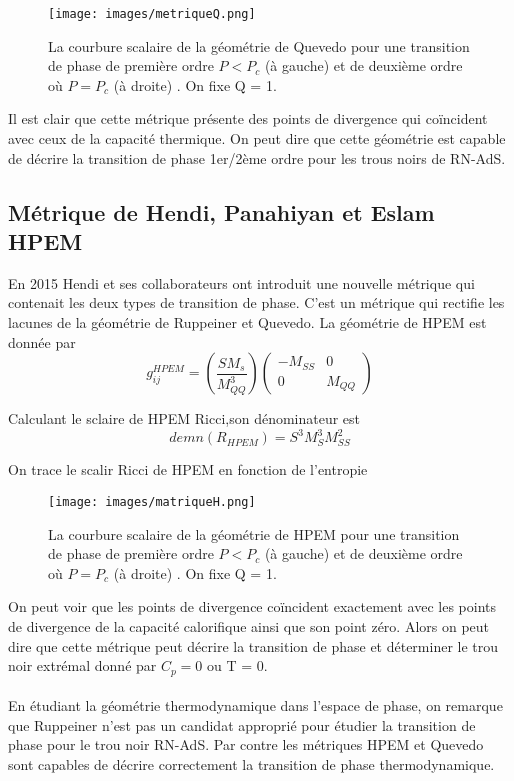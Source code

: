 \documentclass[12pt,  a4paper, openright]{report} %
\begin{document}
\begin{figure}[H]
	\texttt{[image: images/metriqueQ.png]}
	\caption{La courbure scalaire de la géométrie de Quevedo pour une transition de phase
		de première ordre $P < P_{c}$ (à gauche) et de deuxième ordre où $P = P_{c}$ (à droite) . On fixe Q = 1.}
\end{figure}

Il est clair que cette métrique présente des points de divergence qui coïncident avec
ceux de la capacité thermique. On peut dire que cette géométrie est capable de décrire la
transition de phase 1er/2ème ordre pour les trous noirs de RN-AdS.

\subsection{Métrique de Hendi, Panahiyan et Eslam HPEM}
En 2015 Hendi et ses collaborateurs ont introduit une nouvelle métrique \cite{56} qui contenait les deux types de transition de phase. C’est un métrique qui rectifie les lacunes de la
géométrie de Ruppeiner et Quevedo. La géométrie de HPEM est donnée par
\begin{equation}
g_{ij}^{HPEM}=\left( \dfrac{S M_{s}}{M_{QQ}^{3}}\right)
\begin{pmatrix}
-M_{SS}  & 0\\
0        & M_{QQ}
\end{pmatrix}
\end{equation}

Calculant le sclaire de HPEM Ricci,son dénominateur est 
\begin{equation}
demn(R_{HPEM})=S^{3}M_{S}^{3}M_{SS}^{2}
\end{equation}

On trace le scalir Ricci de HPEM  en fonction de l'entropie\\

\begin{figure}[H]
	\texttt{[image: images/matriqueH.png]}
	\caption{La courbure scalaire de la géométrie de HPEM pour une transition de phase
		de première ordre $P < P_{c}$ (à gauche) et de deuxième ordre où $P = P_{c}$ (à droite) . On fixe Q = 1.}
\end{figure}

On peut voir que les points de divergence coïncident exactement avec les points de
divergence de la capacité calorifique ainsi que son point zéro. Alors on peut dire que cette
métrique peut décrire la transition de phase et déterminer le trou noir extrémal donné
par $C_{p} = 0$ ou T = 0.\\
\\
En étudiant la géométrie thermodynamique dans l'espace de phase, on remarque que
Ruppeiner n'est pas un candidat approprié pour étudier la transition de phase pour le
trou noir RN-AdS. Par contre les métriques HPEM et Quevedo sont capables de décrire
correctement la transition de phase thermodynamique.
\end{document}
